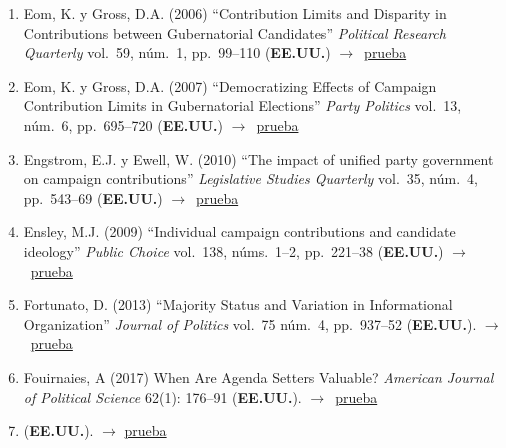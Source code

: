 \documentclass[12 pt, letter]{article}
\newenvironment{CitasMiTrabajo}{
    \begin{footnotesize}
    \begin{enumerate}[label={\footnotesize\emph{cita~\arabic*}},ref=\arabic*] %
        \setlength{\itemsep}{.1\itemsep}
        \setlength{\parskip}{.1\parskip}
    }{\end{enumerate}\end{footnotesize}}
\begin{document}
\begin{CitasMiTrabajo}
        \item Eom, K. y Gross, D.A. (2006)
        ``Contribution Limits and Disparity in Contributions between
        Gubernatorial Candidates'' \emph{Political Research Quarterly} vol.\ 59, n\'um.\
        1, pp.\ 99--110  (\textbf{EE.UU.}) $\rightarrow$~\href{https://github.com/emagar/cv/blob/master/citasMiTrab/coxMagar/eom1.pdf}{prueba}

        \item Eom, K. y Gross, D.A. (2007)
        ``Democratizing Effects of Campaign Contribution Limits in Gubernatorial Elections'' \emph{Party Politics} vol.\ 13, n\'um.\ 6, pp.\ 695--720
        (\textbf{EE.UU.}) $\rightarrow$~\href{https://github.com/emagar/cv/blob/master/citasMiTrab/coxMagar/eom2.pdf}{prueba}

        \item Engstrom, E.J. y Ewell, W. (2010)
        ``The impact of unified party government on campaign contributions'' \emph{Legislative Studies Quarterly} vol.\ 35, n\'um.\ 4, pp.\ 543--69 (\textbf{EE.UU.}) $\rightarrow$~\href{https://github.com/emagar/cv/blob/master/citasMiTrab/coxMagar/eng.pdf}{prueba}

        \item Ensley, M.J. (2009)
        ``Individual campaign contributions and
        candidate ideology'' \emph{Public Choice} vol.\ 138, n\'ums.\
        1--2, pp.\ 221--38  (\textbf{EE.UU.}) $\rightarrow$~\href{https://github.com/emagar/cv/blob/master/citasMiTrab/coxMagar/ensley.pdf}{prueba}

        \item Fortunato, D. (2013)
        ``Majority Status and Variation in Informational Organization''
        \emph{Journal of Politics} vol.\ 75 n\'um.\ 4, pp.\ 937--52 (\textbf{EE.UU.}). $\rightarrow$~\href{https://github.com/emagar/cv/blob/master/citasMiTrab/coxMagar/fortunato2013majority.pdf}{prueba}

       \item Fouirnaies, A (2017) When Are Agenda Setters Valuable? \emph{American Journal of Political Science} 62(1): 176--91  (\textbf{EE.UU.}).  $\rightarrow$~\href{https://www.semanticscholar.org/paper/When-Are-Agenda-Setters-Valuable-Fouirnaies/0d678dfce6af4687df2afab1a34823f2e1f140c9#references}{prueba}
         
       \item {} (\textbf{EE.UU.}).  $\rightarrow$ \href{https://www.semanticscholar.org/paper/How-Do-Interest-Groups-Seek-Access-to-Committees-Fouirnaies-Hall/24bd4967d82425253781f2839f43f565c6fa792b}{prueba}
         

\end{CitasMiTrabajo}
\end{document}
